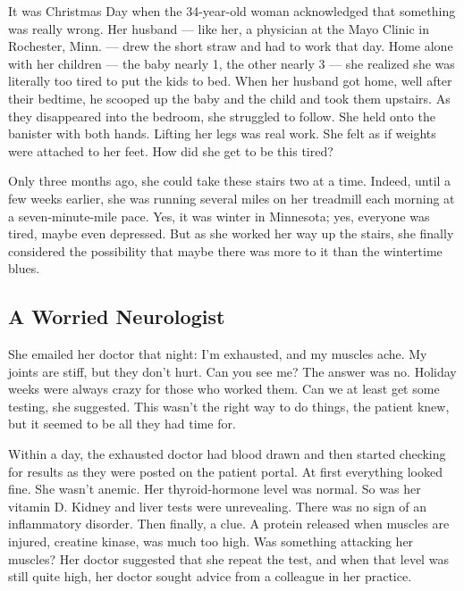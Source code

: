 It was Christmas Day when the 34-year-old woman acknowledged that
something was really wrong. Her husband --- like her, a physician at the
Mayo Clinic in Rochester, Minn. --- drew the short straw and had to work
that day. Home alone with her children --- the baby nearly 1, the other
nearly 3 --- she realized she was literally too tired to put the kids to
bed. When her husband got home, well after their bedtime, he scooped up
the baby and the child and took them upstairs. As they disappeared into
the bedroom, she struggled to follow. She held onto the banister with
both hands. Lifting her legs was real work. She felt as if weights were
attached to her feet. How did she get to be this tired?

Only three months ago, she could take these stairs two at a time.
Indeed, until a few weeks earlier, she was running several miles on her
treadmill each morning at a seven-minute-mile pace. Yes, it was winter
in Minnesota; yes, everyone was tired, maybe even depressed. But as she
worked her way up the stairs, she finally considered the possibility
that maybe there was more to it than the wintertime blues.

\hypertarget{a-worried-neurologist}{%
\subsection{\texorpdfstring{\textbf{A Worried
Neurologist}}{A Worried Neurologist}}\label{a-worried-neurologist}}

She emailed her doctor that night: I'm exhausted, and my muscles ache.
My joints are stiff, but they don't hurt. Can you see me? The answer was
no. Holiday weeks were always crazy for those who worked them. Can we at
least get some testing, she suggested. This wasn't the right way to do
things, the patient knew, but it seemed to be all they had time for.

Within a day, the exhausted doctor had blood drawn and then started
checking for results as they were posted on the patient portal. At first
everything looked fine. She wasn't anemic. Her thyroid-hormone level was
normal. So was her vitamin D. Kidney and liver tests were unrevealing.
There was no sign of an inflammatory disorder. Then finally, a clue. A
protein released when muscles are injured, creatine kinase, was much too
high. Was something attacking her muscles? Her doctor suggested that she
repeat the test, and when that level was still quite high, her doctor
sought advice from a colleague in her practice.

